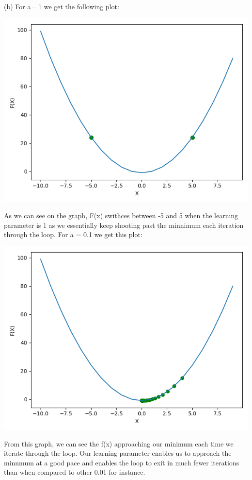 \documentclass[11pt]{article} %
\begin{document}
(b)
\newline
For a= 1 we get the following plot:
\begin{center}
	\includegraphics[scale = 0.5]{a2.png}
\end{center}
As we can see on the graph, F(x) swithces between -5 and 5 when the learning parameter is 1 as we essentially keep shooting past the minnimum each iteration through the loop.
\newline
\newline
For a = 0.1 we get this plot:
\begin{center}
	\includegraphics[scale = 0.5]{a02.png}
\end{center}
From this graph, we can see the f(x) approaching our minimum each time we iterate through the loop. Our learning parameter enables us to approach the minnmum at a good pace and enables the loop to exit in much fewer iterations than when compared to other 0.01 for instance.
\end{document}
